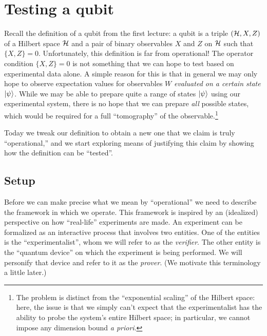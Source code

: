 \chapter{Testing a qubit}

Recall the definition of a qubit from the first lecture: a qubit is a triple $(\mathcal{H},X,Z)$ of a Hilbert space $\mathcal{H}$ and a pair of binary observables $X$ and $Z$ on $\mathcal{H}$ such that $\{X,Z\}=0$. Unfortunately, this definition is far from operational! The operator condition $\{X,Z\}=0$ is not something that we can hope to test based on experimental data alone. A simple reason for this is that in general we may only hope to observe expectation values for observables $W$ \emph{evaluated on a certain state} $|\psi\rangle$. While we may be able to prepare quite a range of states $|\psi\rangle$ using our experimental system, there is no hope that we can prepare \emph{all} possible states, which would be required for a full ``tomography'' of the observable.\footnote{The problem is distinct from the ``exponential scaling'' of the Hilbert space: here, the issue is that we simply can't expect that the experimentalist has the ability to probe the system's entire Hilbert space; in particular, we cannot impose any dimension bound \emph{a priori}.} 

Today we tweak our definition to obtain a new one that we claim is truly ``operational,'' and we start exploring means of justifying this claim by showing how the definition can be ``tested''. 

\section{Setup}

Before we can make precise what we mean by ``operational'' we need to describe the framework in which we operate. This framework is inspired by an (idealized) perspective on how ``real-life'' experiments are made. An experiment can be formalized as an interactive process that involves two entities. One of the entities is the ``experimentalist'', whom we will refer to as the \emph{verifier}. The other entity is the ``quantum device'' on which the experiment is being performed. We will personify that device and refer to it as the \emph{prover}. (We motivate this terminology a little later.) 

